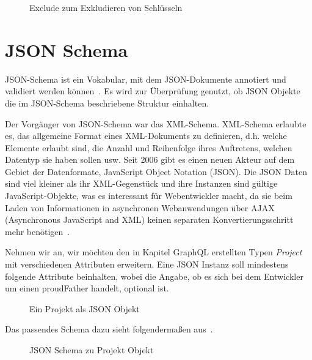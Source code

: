 \begin{figure}[h]
    
    \caption{Exclude zum Exkludieren von Schlüsseln}
    \label{fig:basics:typescript:6}
\end{figure}


\section{JSON Schema}
\label{sec:basics:jsonschema}
JSON-Schema ist ein Vokabular, mit dem JSON-Dokumente  annotiert und validiert werden können~\cite{json-schema}.
Es wird zur Überprüfung genutzt, ob JSON Objekte die im JSON-Schema beschriebene Struktur einhalten.

Der Vorgänger von JSON-Schema war das XML-Schema.
XML-Schema erlaubte es, das allgemeine Format eines XML-Dokuments zu definieren,
d.h. welche Elemente erlaubt sind, die Anzahl und Reihenfolge ihres Auftretens, welchen Datentyp sie haben sollen usw.
Seit 2006 gibt es einen neuen Akteur auf dem Gebiet der Datenformate, JavaScript Object Notation (JSON).
Die JSON Daten sind viel kleiner als ihr XML-Gegenstück und ihre Instanzen sind gültige JavaScript-Objekte, was es interessant für Webentwickler macht, da sie beim Laden von
Informationen in asynchronen Webanwendungen über AJAX (Asynchronous JavaScript and XML) keinen separaten Konvertierungsschritt mehr benötigen~\cite{json-schema-xml}.

Nehmen wir an, wir möchten den in Kapitel GraphQL erstellten Typen \emph{Project}~ mit verschiedenen Attributen erweitern.
Eine JSON Instanz soll mindestens folgende Attribute beinhalten, wobei die Angabe, ob es sich bei dem Entwickler
um einen proudFather handelt, optional ist.

\begin{figure}[h]
    
    \caption{Ein Projekt als JSON Objekt}
    \label{fig:basics:jsonschema:1}
\end{figure}

Das passendes Schema dazu sieht folgendermaßen aus~.

\begin{figure}[hb!]
    
    \caption{JSON Schema zu Projekt Objekt}
    \label{fig:basics:jsonschema:2}
\end{figure}

